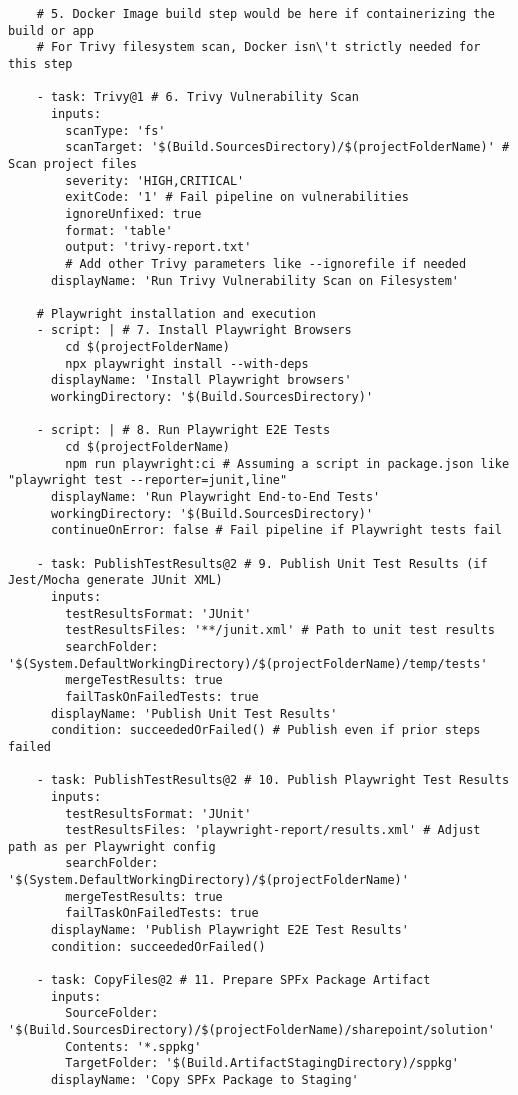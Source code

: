 \begin{verbatim}
    # 5. Docker Image build step would be here if containerizing the build or app
    # For Trivy filesystem scan, Docker isn\'t strictly needed for this step

    - task: Trivy@1 # 6. Trivy Vulnerability Scan
      inputs:
        scanType: 'fs'
        scanTarget: '$(Build.SourcesDirectory)/$(projectFolderName)' # Scan project files
        severity: 'HIGH,CRITICAL'
        exitCode: '1' # Fail pipeline on vulnerabilities
        ignoreUnfixed: true
        format: 'table'
        output: 'trivy-report.txt'
        # Add other Trivy parameters like --ignorefile if needed
      displayName: 'Run Trivy Vulnerability Scan on Filesystem'

    # Playwright installation and execution
    - script: | # 7. Install Playwright Browsers
        cd $(projectFolderName)
        npx playwright install --with-deps
      displayName: 'Install Playwright browsers'
      workingDirectory: '$(Build.SourcesDirectory)'

    - script: | # 8. Run Playwright E2E Tests
        cd $(projectFolderName)
        npm run playwright:ci # Assuming a script in package.json like "playwright test --reporter=junit,line"
      displayName: 'Run Playwright End-to-End Tests'
      workingDirectory: '$(Build.SourcesDirectory)'
      continueOnError: false # Fail pipeline if Playwright tests fail

    - task: PublishTestResults@2 # 9. Publish Unit Test Results (if Jest/Mocha generate JUnit XML)
      inputs:
        testResultsFormat: 'JUnit'
        testResultsFiles: '**/junit.xml' # Path to unit test results
        searchFolder: '$(System.DefaultWorkingDirectory)/$(projectFolderName)/temp/tests'
        mergeTestResults: true
        failTaskOnFailedTests: true
      displayName: 'Publish Unit Test Results'
      condition: succeededOrFailed() # Publish even if prior steps failed

    - task: PublishTestResults@2 # 10. Publish Playwright Test Results
      inputs:
        testResultsFormat: 'JUnit'
        testResultsFiles: 'playwright-report/results.xml' # Adjust path as per Playwright config
        searchFolder: '$(System.DefaultWorkingDirectory)/$(projectFolderName)'
        mergeTestResults: true
        failTaskOnFailedTests: true
      displayName: 'Publish Playwright E2E Test Results'
      condition: succeededOrFailed()

    - task: CopyFiles@2 # 11. Prepare SPFx Package Artifact
      inputs:
        SourceFolder: '$(Build.SourcesDirectory)/$(projectFolderName)/sharepoint/solution'
        Contents: '*.sppkg'
        TargetFolder: '$(Build.ArtifactStagingDirectory)/sppkg'
      displayName: 'Copy SPFx Package to Staging'


\end{verbatim}
